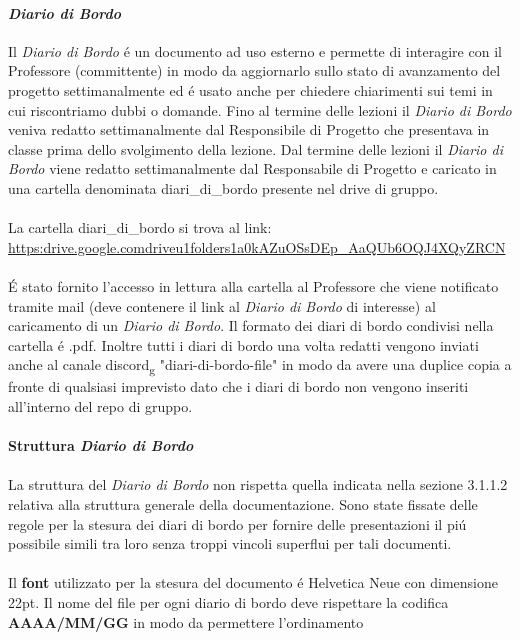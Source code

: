 \paragraph{\textit{Diario di Bordo}}
Il \textit{Diario di Bordo} é un documento ad uso esterno e permette di interagire con il Professore (committente) in modo da aggiornarlo sullo stato di avanzamento del progetto settimanalmente ed é usato 
anche per chiedere chiarimenti sui temi in cui riscontriamo dubbi o domande.
Fino al termine delle lezioni il \textit{Diario di Bordo} veniva redatto settimanalmente dal Responsibile di Progetto che presentava in classe prima dello svolgimento 
della lezione.
Dal termine delle lezioni il \textit{Diario di Bordo} viene redatto settimanalmente dal Responsabile di Progetto e caricato in una cartella denominata diari\_di\_bordo presente nel drive di gruppo.
\\\\
La cartella diari\_di\_bordo si trova al link: \href{https://drive.google.com/drive/u/1/folders/1a0kAZuOSsDEp_AaQUb6OQJ4XQyZ--RCN}{\\https:\/\/drive.google.com\/drive\/u\/1\/folders\/1a0kAZuOSsDEp\_AaQUb6OQJ4XQyZ\-\-RCN}
\\\\
É stato fornito l'accesso in lettura alla cartella al Professore che viene notificato tramite mail (deve contenere il link al \textit{Diario di Bordo} di interesse) al caricamento di un \textit{Diario di Bordo}.
Il formato dei diari di bordo condivisi nella cartella é .pdf.
Inoltre tutti i diari di bordo una volta redatti vengono inviati anche al canale discord\textsubscript{g} "diari-di-bordo-file" in modo da avere una duplice copia a fronte di 
qualsiasi imprevisto dato che i diari di bordo non vengono inseriti all'interno del repo di gruppo.
\\\\
\textbf{Struttura \textit{Diario di Bordo}} 
\\\\
La struttura del \textit{Diario di Bordo} non rispetta quella indicata nella sezione 3.1.1.2 relativa alla struttura generale della documentazione.
Sono state fissate delle regole per la stesura dei diari di bordo per fornire delle presentazioni il piú possibile simili tra loro 
senza troppi vincoli superflui per tali documenti.
\\\\
Il \textbf{font} utilizzato per la stesura del documento é Helvetica Neue con dimensione 22pt.
Il nome del file per ogni diario di bordo deve rispettare la codifica \textbf{AAAA/MM/GG} in modo da permettere l'ordinamento
